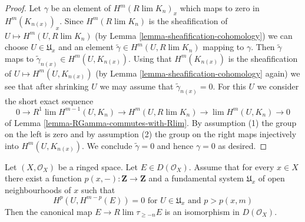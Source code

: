 \begin{proof}
Let $\gamma$ be an element of $H^m(R\lim K_n)_x$ which maps to zero
in $H^m(K_{n(x)})_x$. Since $H^m(R\lim K_n)$ is the sheafification
of $U \mapsto H^m(U, R\lim K_n)$
(by Lemma \ref{lemma-sheafification-cohomology})
we can choose $U \in \mathfrak{U}_x$
and an element $\tilde \gamma \in H^m(U, R\lim K_n)$ mapping to $\gamma$.
Then $\tilde\gamma$ maps to $\tilde\gamma_{n(x)} \in H^m(U, K_{n(x)})$.
Using that $H^m(K_{n(x)})$ is the sheafification of
$U \mapsto H^m(U, K_{n(x)})$
(by Lemma \ref{lemma-sheafification-cohomology} again)
we see that after shrinking $U$ we may assume that $\tilde\gamma_{n(x)} = 0$.
For this $U$ we consider the short exact sequence
$$
0 \to
R^1\lim H^{m - 1}(U, K_n) \to H^m(U, R\lim K_n) \to
\lim H^m(U, K_n) \to 0
$$
of Lemma \ref{lemma-RGamma-commutes-with-Rlim}.
By assumption (1) the group on the left is zero and by
assumption (2) the group on the right maps injectively
into $H^m(U, K_{n(x)})$. We conclude $\tilde\gamma = 0$
and hence $\gamma = 0$ as desired.
\end{proof}

\begin{lemma}
\label{lemma-is-limit-per-point}
Let $(X, \mathcal{O}_X)$ be a ringed space. Let $E \in D(\mathcal{O}_X)$.
Assume that for every $x \in X$ there exist
a function $p(x, -) : \mathbf{Z} \to \mathbf{Z}$ and
a fundamental system $\mathfrak{U}_x$ of open neighbourhoods of $x$
such that
$$
H^p(U, H^{m - p}(E)) = 0 \text{ for }
U \in \mathfrak{U}_x \text{ and } p > p(x, m)
$$
Then the canonical map $E \to R\lim \tau_{\geq -n} E$
is an isomorphism in $D(\mathcal{O}_X)$.
\end{lemma}

